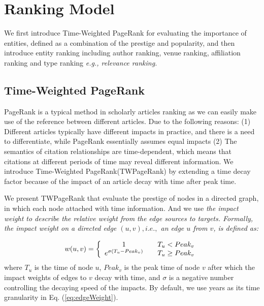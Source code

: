 \section{Ranking Model}
\label{sec-model}

\par
We first introduce Time-Weighted PageRank for evaluating the importance of entities, defined as a combination of the prestige and popularity, and then introduce entity ranking including author ranking, venue ranking, affiliation ranking and type ranking \itshape e.g., \upshape relevance ranking.


\subsection{Time-Weighted PageRank}
\par
PageRank is a typical method in scholarly articles ranking as we can easily make use of the reference between different articles. Due to the following reasons: (1) Different articles typically have different impacts in practice, and there is a need to differentiate, while PageRank essentially assumes equal impacts (2) The semantics of citation relationships are time-dependent, which means that citations at different periods of time may reveal different information. We introduce Time-Weighted PageRank(TWPageRank) by extending a time decay factor because of the impact of an article decay with time after peak time.

\par
We present TWPageRank that evaluate the prestige of nodes in a directed graph, in which each node attached with time information. And we use \itshape the impact weight \upshape to describe the relative weight from the edge sources to targets. Formally, the impact weight on a directed edge $(u,v), i.e.,$ an edge $u$ from $v$, is defined as:

\begin{equation}
\centering
\label{eq:edgeWeight}
w(u,v)=\left \{
\begin{array}{ccl}
1                        &    &{T_u   <   Peak_v} \\
e^{\sigma (T_u-Peak_v)}  &    &{T_u   \ge Peak_v} \\
\end{array} \right.
\end {equation}
where $T_u$ is the time of node $u$, $Peak_v$ is the peak time of node $v$ after which the impact weights of edges to $v$ decay with time, and $\sigma$ is a negative number controlling the decaying speed of the impacts. By default, we use years as its time granularity in Eq. (\ref{eq:edgeWeight}).

